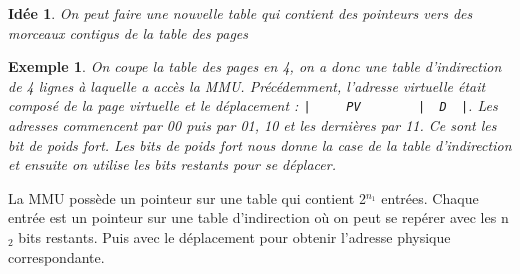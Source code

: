 \documentclass[12pt,a4paper]{report}
\newtheorem*{ex}{Exemple}
\newtheorem*{id}{Idée}
\begin{document}
\begin{center}
\end{center}
\begin{id} On peut faire une nouvelle table qui contient des pointeurs vers des morceaux contigus de la table des pages\end{id}

\begin{ex}On coupe la table des pages en 4, on a donc une table d'indirection de 4 lignes à laquelle a accès la MMU. Précédemment, l'adresse virtuelle était composé de la page virtuelle et le déplacement : \verb?|     PV        |  D  |?. Les adresses commencent par 00 puis par 01, 10 et les dernières par 11. Ce sont les bit de poids fort. Les bits de poids fort nous donne la case de la table d'indirection et ensuite on utilise les bits restants pour se déplacer. \end{ex}

\begin{center}
\end{center}

La MMU possède un pointeur sur une table qui contient 2$^{n_1}$ entrées. Chaque entrée est un pointeur sur une table d'indirection où on peut se repérer avec les n$_2$ bits restants. Puis avec le déplacement pour obtenir l'adresse physique correspondante.\\
\end{document}
